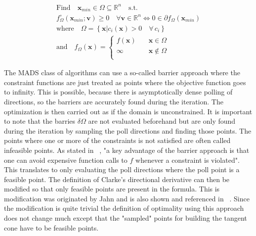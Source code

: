 \documentclass[a4paper,10pt]{article}
\renewcommand{\vec}[1]{\mathbf{#1}}
\begin{document}
    \begin{equation}
    \label{equ:optimality_mads}
        \begin{gathered}
        \text{Find} \quad \vec{x}_{min} \in \Omega \subseteq \mathbb{R}^n \quad \text{s.t.}\\
        f_{\Omega}^{\circ}(\vec{x}_{min}; \vec{v}) \geq 0 \quad \forall
             \vec{v} \in \mathbb{R}^n
            \Longleftrightarrow
            0 \in \partial f_{\Omega}(\vec{x}_{min})\\
        \text{where} \quad \Omega = \left \{  \vec{x} \vert  c_i(\vec{x}) > 0 \quad \forall \, c_i \right \}\\
        \text{and} \quad f_{\Omega}(\vec{x}) = 
        \begin{cases}
            f(\vec{x}) & \quad \vec{x} \in \Omega \\
            \infty & \quad \vec{x} \notin \Omega \\
        \end{cases}
        \end{gathered}
    \end{equation}

    The MADS class of algorithms can use a so-called barrier approach where the
    constraint functions are just treated as points where the objective function
    goes to infinity.
    This is possible, because there is asymptotically dense polling of directions,
    so the barriers are accurately found during the iteration.
    The optimization is then carried out as if the domain is unconstrained.
    It is important to note that the barries $\delta\Omega$ are not 
    evaluated beforehand but are only found during the iteration by
    sampling the poll directions and finding those points.
    The points where one or more of the constraints is not satisfied are often called
    infeasible points.
    As stated in ~\cite{mads_original}, "a key advantage of the barrier
    approach is that one can avoid expensive function calls to $f$ whenever
    a constraint is violated".
    This translates to only evaluating the poll directions where the
    poll point is a feasible point.
    The definition of Clarke's directional derivative can then be modified
    so that only feasible points are present in the formula.
    This is modification was originated by Jahn and is also shown
    and referenced in ~\cite{mads_original}.
    Since the modification is quite trivial the definition of optimality
    using this approach does not change much except that the
    "sampled" points for building the tangent cone have to be feasible
    points.  
\end{document}
